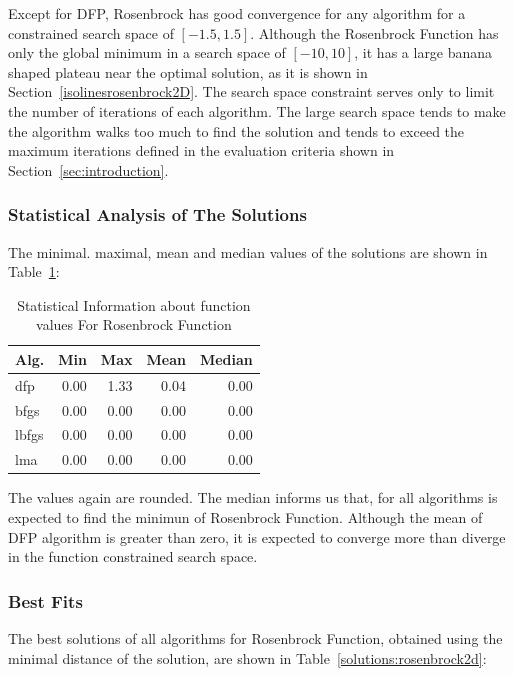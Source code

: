 \documentclass[conference]{IEEEtran}
\begin{document}
Except for DFP, Rosenbrock has good convergence for any algorithm for a constrained search space
of $\left[-1.5, 1.5\right]$. Although the Rosenbrock Function has only the global minimum in a
search space of $\left[-10, 10\right]$, it has a large banana shaped plateau near the optimal
solution, as it is shown in Section~\ref{isolinesrosenbrock2D}. The search space constraint serves
only to limit the number of iterations of each algorithm. The large search space tends to make the algorithm
walks too much to find the solution and tends to exceed the maximum iterations defined in the evaluation
criteria shown in Section~\ref{sec:introduction}.

\subsubsection{Statistical Analysis of The Solutions}
\label{statisticalanalysisrosenbrock2d2D}


The minimal. maximal, mean and median values of the solutions are shown in Table~\ref{function_values:rosenbrock2d}:

\begin{table}[H]
\centering
\caption{Statistical Information about function values For Rosenbrock Function}
\label{function_values:rosenbrock2d}
\begin{tabular}{lrrrr}
\toprule
 Alg. &  Min &  Max &  Mean &  Median \\
\midrule
  dfp & 0.00 & 1.33 &  0.04 &    0.00 \\
 bfgs & 0.00 & 0.00 &  0.00 &    0.00 \\
lbfgs & 0.00 & 0.00 &  0.00 &    0.00 \\
  lma & 0.00 & 0.00 &  0.00 &    0.00 \\
\bottomrule
\end{tabular}
\end{table}

The values again are rounded. The median informs us that, for all
algorithms is expected to find the minimun of Rosenbrock Function.
Although the mean of DFP algorithm is greater than zero, it is expected
to converge more than diverge in the function constrained search space.
\subsubsection{Best Fits}
\label{bestfitsrosenbrock2d2D}


The best solutions of all algorithms for Rosenbrock Function, obtained using the minimal
distance of the solution, are shown in Table~\ref{solutions:rosenbrock2d}:
\end{document}
